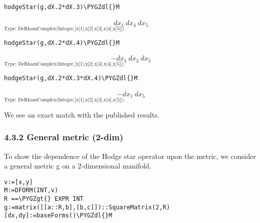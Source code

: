 \documentclass[letterpaper,10pt,english]{sphinxmanual}
\def\PYGZgt{\char`\>}
\def\PYGZdl{\char`\$}
\begin{document}
\begin{Verbatim}[commandchars=\\\{\}]
hodgeStar(g,dX.2*dX.3)\PYGZdl{}M
\end{Verbatim}
\begin{equation*}
\begin{split}{dx _ {1}} \  {dx _ {4}} \  {dx _ {5}}\end{split}
\end{equation*}
$_{\text{Type: DeRhamComplex(Integer,{[}x{[}1{]},x{[}2{]},x{[}3{]},x{[}4{]},x{[}5{]}{]})}}$

\begin{Verbatim}[commandchars=\\\{\}]
hodgeStar(g,dX.2*dX.4)\PYGZdl{}M
\end{Verbatim}
\begin{equation*}
\begin{split}-{{dx _ {1}} \  {dx _ {3}} \  {dx _ {5}}}\end{split}
\end{equation*}
$_{\text{Type: DeRhamComplex(Integer,{[}x{[}1{]},x{[}2{]},x{[}3{]},x{[}4{]},x{[}5{]}{]})}}$

\begin{Verbatim}[commandchars=\\\{\}]
hodgeStar(g,dX.2*dX.3*dX.4)\PYGZdl{}M
\end{Verbatim}
\begin{equation*}
\begin{split}-{{dx _ {1}} \  {dx _ {5}}}\end{split}
\end{equation*}
$_{\text{Type: DeRhamComplex(Integer,{[}x{[}1{]},x{[}2{]},x{[}3{]},x{[}4{]},x{[}5{]}{]})}}$

We see an exact match with the published results.


\subsubsection{4.3.2 General metric (2-dim)}
\label{section-4.0:general-metric-2-dim}
To show the dependence of the Hodge star operator upon the metric, we consider
a general metric g on a 2-dimensional manifold.

\begin{Verbatim}[commandchars=\\\{\}]
v:=[x,y]
M:=DFORM(INT,v)
R ==\PYGZgt{} EXPR INT
g:=matrix([[a::R,b],[b,c]])::SquareMatrix(2,R)
[dx,dy]:=baseForms()\PYGZdl{}M
\end{Verbatim}
\end{document}
